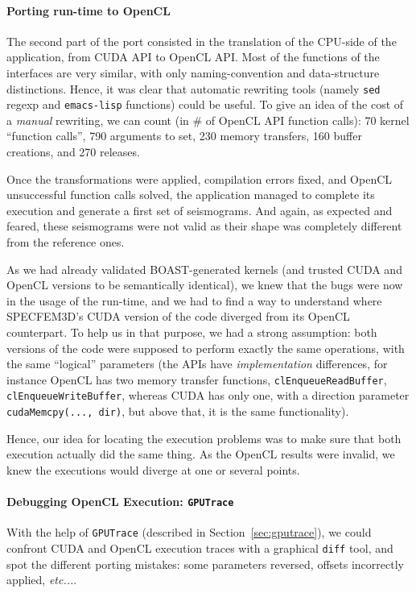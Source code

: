 \documentclass{IEEEtran}
\newcommand{\latin}[1]{\textit{#1}}
\newcommand{\etc}[1]{\latin{etc...}}
\newcommand{\code}[1]{\texttt{#1}}
\begin{document}
\paragraph{Porting run-time to OpenCL} The second part of the port
consisted in the translation of the CPU-side of the application, from
CUDA API to OpenCL API. Most of the functions of the interfaces are
very similar, with only naming-convention and data-structure
distinctions. Hence, it was clear that automatic rewriting tools
(namely \code{sed} regexp and \code{emacs-lisp} functions) could be
useful. To give an idea of the cost of a \emph{manual} rewriting, we
can count (in \# of OpenCL API function calls): 70 kernel ``function
calls'', 790 arguments to set, 230 memory transfers, 160 buffer
creations, and 270 releases.

Once the transformations were applied,
compilation errors fixed, and OpenCL unsuccessful function calls solved,
the application managed to complete its execution and generate a first
set of seismograms. And again, as expected and feared, these
seismograms were not valid as their shape was completely different from the
reference ones.

As we had already validated BOAST-generated kernels (and trusted CUDA and OpenCL
versions to be semantically identical), we knew that the bugs were now in the
usage of the run-time, and we had to find a way to understand where SPECFEM3D's
CUDA version of the code diverged from its OpenCL counterpart. To help us in
that purpose, we had a strong assumption: both versions of the code were
supposed to perform exactly the same operations, with the same ``logical''
parameters (the APIs have \emph{implementation} differences, for instance OpenCL
has two memory transfer functions, \code{clEnqueueReadBuffer},
\code{clEnqueueWriteBuffer}, whereas CUDA has only one, with a direction
parameter \code{cudaMemcpy(..., dir)}, but above that, it is the same
functionality).

Hence, our idea for locating the execution problems was to make sure
that both execution actually did the same thing. As the OpenCL results
were invalid, we knew the executions would diverge at one or several
points.

\paragraph{Debugging OpenCL Execution: \code{GPUTrace}} 
With the help of \code{GPUTrace} (described in Section~\ref{sec:gputrace}), we
could confront CUDA and OpenCL execution traces with a graphical \code{diff}
tool, and spot the different porting mistakes: some parameters reversed,
offsets incorrectly applied, \etc{}. 
\end{document}

